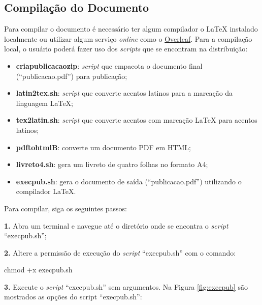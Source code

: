 \subsection{Compilação do Documento}
\label{sec:compilacao}

Para compilar o documento é necessário ter algum compilador o \LaTeX{} instalado localmente ou utilizar algum serviço \textit{online} como o \href{https://www.overleaf.com/}{Overleaf}. Para a compilação local, o usuário poderá fazer uso dos \textit{scripts} que se encontram na distribuição:

\begin{itemize}
    \item \textbf{criapublicacaozip}: \textit{script} que empacota o documento final (``publicacao.pdf'') para publicação;
    \item \textbf{latin2tex.sh}: \textit{script} que converte acentos latinos para a marcação da linguagem \LaTeX{};
    \item \textbf{tex2latin.sh}: \textit{script} que converte acentos com marcação \LaTeX{} para acentos latinos;
    \item \textbf{pdftohtmlB}: converte um documento PDF em HTML;
    \item \textbf{livreto4.sh}: gera um livreto de quatro folhas no formato A4;
    \item \textbf{execpub.sh}: gera o documento de saída (``publicacao.pdf'') utilizando o compilador \LaTeX{}. 
\end{itemize}

Para compilar, siga os seguintes passos:

\textbf{1.} Abra um terminal e navegue até o diretório onde se encontra o \textit{script} ``execpub.sh'';

\textbf{2.} Altere a permissão de execução do \textit{script} ``execpub.sh'' com o comando:
\begin{commandshell}
chmod +x execpub.sh
\end{commandshell}

\textbf{3.} Execute o \textit{script} ``execpub.sh'' sem argumentos. Na Figura \ref{fig:execpub} são mostrados as opções do script ``execpub.sh'': 

